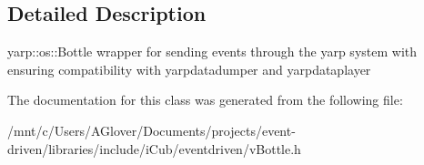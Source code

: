 \subsection{Detailed Description}
yarp\+::os\+::\+Bottle wrapper for sending events through the yarp system with ensuring compatibility with yarpdatadumper and yarpdataplayer 

The documentation for this class was generated from the following file\+:\begin{DoxyCompactItemize}
\item 
/mnt/c/\+Users/\+A\+Glover/\+Documents/projects/event-\/driven/libraries/include/i\+Cub/eventdriven/v\+Bottle.\+h\end{DoxyCompactItemize}
